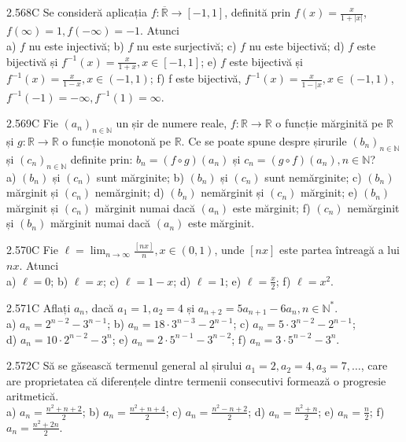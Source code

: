 \documentclass[11pt]{article}
\begin{document}
2.568C Se consideră aplicația $f: \overline{\mathbb{R}} \rightarrow[-1,1]$, definită prin $f(x)=\frac{x}{1+|x|}$, $f(\infty)=1, f(-\infty)=-1$. Atunci\\ a) $f$ nu este injectivă; b) $f$ nu este surjectivă; c) $f$ nu este bijectivă; d) $f$ este bijectivă și $f^{-1}(x)=\frac{x}{1+x}, x \in[-1,1]$; e) $f$ este bijectivă și $f^{-1}(x)=\frac{x}{1-x}, x \in(-1,1)$; f) f este bijectivă, $f^{-1}(x)=\frac{x}{1-\mid x}, x \in(-1,1)$, $f^{-1}(-1)=-\infty, f^{-1}(1)=\infty$.

2.569C Fie $\left(a_{n}\right)_{n \in \mathbb{N}}$ un șir de numere reale, $f: \mathbb{R} \rightarrow \mathbb{R}$ o funcție mărginită pe $\mathbb{R}$ și $g: \mathbb{R} \rightarrow \mathbb{R}$ o funcție monotonă pe $\mathbb{R}$. Ce se poate spune despre șirurile $\left(b_{n}\right)_{n \in \mathbb{N}}$ și $\left(c_{n}\right)_{n \in \mathbb{N}}$ definite prin: $b_{n}=(f \circ g)\left(a_{n}\right)$ și $c_{n}=(g \circ f)\left(a_{n}\right), n \in \mathbb{N}$?\\ a) $\left(b_{n}\right)$ și $\left(c_{n}\right)$ sunt mărginite; b) $\left(b_{n}\right)$ și $\left(c_{n}\right)$ sunt nemărginite; c) $\left(b_{n}\right)$ mărginit și $\left(c_{n}\right)$ nemărginit; d) $\left(b_{n}\right)$ nemărginit și $\left(c_{n}\right)$ mărginit; e) $\left(b_{n}\right)$ mărginit și $\left(c_{n}\right)$ mărginit numai dacă $\left(a_{n}\right)$ este mărginit; f) $\left(c_{n}\right)$ nemărginit și $\left(b_{n}\right)$ mărginit numai dacă $\left(a_{n}\right)$ este mărginit.

2.570C Fie $\ell=\lim _{n \rightarrow \infty} \frac{[n x]}{n}, x \in(0,1)$, unde $[n x]$ este partea întreagă a lui $n x$. Atunci\\ a) $\ell=0$; b) $\ell=x$; c) $\ell=1-x$; d) $\ell=1$; e) $\ell=\frac{x}{2}$; f) $\ell=x^{2}$.

2.571C Aflați $a_{n}$, dacă $a_{1}=1, a_{2}=4$ și $a_{n+2}=5 a_{n+1}-6 a_{n}, n \in \mathbb{N}^{*}$.\\ a) $a_{n}=2^{n-2}-3^{n-1}$; b) $a_{n}=18 \cdot 3^{n-3}-2^{n-1}$; c) $a_{n}=5 \cdot 3^{n-2}-2^{n-1}$;\\ d) $a_{n}=10 \cdot 2^{n-2}-3^{n}$; e) $a_{n}=2 \cdot 5^{n-1}-3^{n-2}$; f) $a_{n}=3 \cdot 5^{n-2}-3^{n}$.

2.572C Să se găsească termenul general al șirului $a_{1}=2, a_{2}=4, a_{3}=7, \ldots$, care are proprietatea că diferențele dintre termenii consecutivi formează o progresie aritmetică.\\ a) $a_{n}=\frac{n^{2}+n+2}{2}$; b) $a_{n}=\frac{n^{2}+n+4}{2}$; c) $a_{n}=\frac{n^{2}-n+2}{2}$; d) $a_{n}=\frac{n^{2}+n}{2}$; e) $a_{n}=\frac{n}{2}$; f) $a_{n}=\frac{n^{2}+2 n}{2}$.
\end{document}
